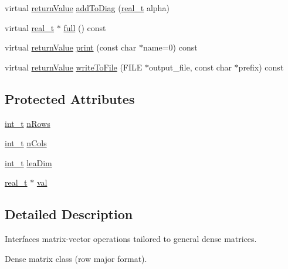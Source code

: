 \begin{DoxyCompactItemize}
\item 
virtual \hyperlink{_message_handling_8hpp_a81d556f613bfbabd0b1f9488c0fa865e}{return\+Value} \hyperlink{class_dense_matrix_ac901971278139a1413ff75d6106aa43b}{add\+To\+Diag} (\hyperlink{qp_o_a_s_e_s__wrapper_8h_a0d00e2b3dfadee81331bbb39068570c4}{real\+\_\+t} alpha)
\item 
virtual \hyperlink{qp_o_a_s_e_s__wrapper_8h_a0d00e2b3dfadee81331bbb39068570c4}{real\+\_\+t} $\ast$ \hyperlink{class_dense_matrix_abde94ef6ed541004e664a655a4bd2e3e}{full} () const
\item 
virtual \hyperlink{_message_handling_8hpp_a81d556f613bfbabd0b1f9488c0fa865e}{return\+Value} \hyperlink{class_dense_matrix_a248f137d9f0f1cd385d9c73a847bf88e}{print} (const char $\ast$name=0) const
\item 
virtual \hyperlink{_message_handling_8hpp_a81d556f613bfbabd0b1f9488c0fa865e}{return\+Value} \hyperlink{class_dense_matrix_a7f2d13f52bfac45dcf25a1db64569317}{write\+To\+File} (F\+I\+LE $\ast$output\+\_\+file, const char $\ast$prefix) const
\end{DoxyCompactItemize}
\subsection*{Protected Attributes}
\begin{DoxyCompactItemize}
\item 
\hyperlink{_types_8hpp_ab6fd6105e64ed14a0c9281326f05e623}{int\+\_\+t} \hyperlink{class_dense_matrix_a683ce6b9b1c1b77256eddd9b678a4fab}{n\+Rows}
\item 
\hyperlink{_types_8hpp_ab6fd6105e64ed14a0c9281326f05e623}{int\+\_\+t} \hyperlink{class_dense_matrix_a00810a0c8d40c606c6eea0bfaccbb656}{n\+Cols}
\item 
\hyperlink{_types_8hpp_ab6fd6105e64ed14a0c9281326f05e623}{int\+\_\+t} \hyperlink{class_dense_matrix_aef0770dde876311b257607ce5aeba74d}{lea\+Dim}
\item 
\hyperlink{qp_o_a_s_e_s__wrapper_8h_a0d00e2b3dfadee81331bbb39068570c4}{real\+\_\+t} $\ast$ \hyperlink{class_dense_matrix_a7de2a860c753fae01ba92b2d204d71bd}{val}
\end{DoxyCompactItemize}


\subsection{Detailed Description}
Interfaces matrix-\/vector operations tailored to general dense matrices. 

Dense matrix class (row major format).

